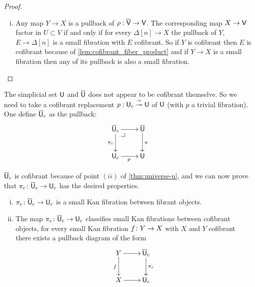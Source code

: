\documentclass[reqno,10pt,a4paper,oneside,draft]{amsart}
\begin{document}
\begin{proof}
\begin{enumerate}[(i)]
\item Any map $Y \rightarrow X$ is a pullback of $\rho: \overline{\mathsf{V}} \rightarrow \mathsf{V}$. The corresponding map $X \rightarrow \mathsf{V}$ factor in $U \subset V$ if and only if for every $\Delta[n] \rightarrow X$ the pullback of $Y$, $E \rightarrow \Delta[n]$ is a small fibration with $E$ cofibrant. So if $Y$ is cofibrant then $E$ is cofibrant because of \ref{lem:cofibrant_fiber_product} and if $Y \rightarrow X$ is a small fibration then any of its pullback is also a small fibration.

 \qedhere
\end{enumerate}
\end{proof} 



The simplicial set $\mathsf{U}$ and $\overline{\mathsf{U}}$ does not appear to be cofibrant themselve. So we need to take a cofibrant replacement $p:\mathsf{U}_c \overset{\sim}{\twoheadrightarrow} \mathsf{U}$ of $\mathsf{U}$ (with $p$ a trivial fibration). One define $\overline{\mathsf{U}}_c$ as the pullback: 
\[
\xymatrix{
\UU_c \ar[d]_{\pi_c} \ar[r] \drpullback & \UU \ar[d]^{\pi}  \\
\U_c \ar[r]_p & \U}
\]

$\overline{\mathsf{U}}_c$ is cofibrant because of point $(ii)$ of \ref{thm:universe-u}, and  we can now prove that $\pi_c \colon \overline{\mathsf{U}}_c \to \mathsf{U}_c$ has the desired properties.


\begin{proposition} \label{thm:universe-uc} 
\hfill 
\begin{enumerate}[(i)] 
\item $\pi_c \colon \overline{\mathsf{U}}_c \to \mathsf{U}_c$ is a small Kan fibration between fibrant objects. 
\item The map $\pi_c \colon \overline{\mathsf{U}}_c \to \mathsf{U}_c$ classifies small Kan fibrations between cofibrant objects, \ie 
for every small Kan fibration $f \colon Y \to X$ with $X$ and $Y$ cofibrant there exists a pullback diagram of the form
\[
\xymatrix{
Y \ar[r] \ar[d]_f & \UU_c \ar[d]^{\pi_c} \\
X \ar[r] & \U_c }
\]

\end{enumerate}
\end{proposition}
\end{document}
